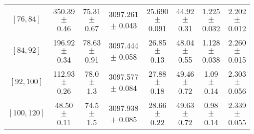 \begin{tabular}{c||c|c|c|c|c|c|c}
$[76, 84]$ & 350.39 $\pm$ 0.46 & 75.31 $\pm$ 0.67 & 3097.261 $\pm$ 0.043 & 25.690 $\pm$ 0.091 & 44.92 $\pm$ 0.31 & 1.225 $\pm$ 0.032 & 2.202 $\pm$ 0.012\\
$[84, 92]$ & 196.92 $\pm$ 0.34 & 78.63 $\pm$ 0.91 & 3097.444 $\pm$ 0.058 & 26.85 $\pm$ 0.13 & 48.04 $\pm$ 0.55 & 1.128 $\pm$ 0.038 & 2.260 $\pm$ 0.015\\
$[92, 100]$ & 112.93 $\pm$ 0.26 & 78.0 $\pm$ 1.3 & 3097.577 $\pm$ 0.084 & 27.88 $\pm$ 0.18 & 49.46 $\pm$ 0.72 & 1.09 $\pm$ 0.14 & 2.303 $\pm$ 0.056\\
$[100, 120]$ & 48.50 $\pm$ 0.11 & 74.5 $\pm$ 1.5 & 3097.938 $\pm$ 0.085 & 28.66 $\pm$ 0.22 & 49.63 $\pm$ 0.72 & 0.98 $\pm$ 0.14 & 2.339 $\pm$ 0.055\\
\end{tabular}
